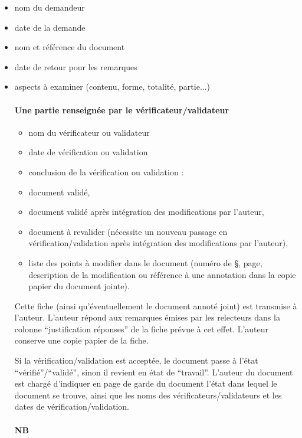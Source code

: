 \begin{itemize}
\item nom du demandeur
\item date de la demande
\item nom et référence du document
\item date de retour pour les remarques
\item aspects à examiner (contenu, forme, totalité, partie...)

\paragraph{Une partie renseignée par le vérificateur/validateur}

\begin{itemize}
\item nom du vérificateur ou validateur
\item date de vérification ou validation
\item conclusion de la vérification ou validation :
\item document validé,
\item document validé après intégration des modifications par l'auteur,
\item document à revalider (nécessite un nouveau passage en vérification/validation après intégration des modifications par l'auteur),
\item liste des points à modifier dans le document (numéro de §, page, description de la modification ou référence à une annotation dans la copie papier du document jointe).
\end{itemize}

Cette fiche (ainsi qu'éventuellement le document annoté joint) est transmise à l'auteur.
L'auteur répond aux remarques émises par les relecteurs dans la colonne ``justification réponses'' de la fiche prévue à cet effet.
L'auteur conserve une copie papier de la fiche.

Si la vérification/validation est acceptée, le document passe à l'état ``vérifié''/``validé'', sinon il revient en état de ``travail''.
L'auteur du document est chargé d'indiquer en page de garde du document l'état dans lequel le document se trouve, ainsi que les noms des vérificateurs/validateurs et les dates de vérification/validation.

\paragraph{NB}


\end{itemize}
